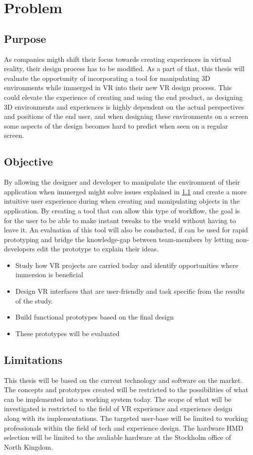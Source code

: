 \section{Problem}

\subsection{Purpose}
\label{intro:purpose}
As companies migth shift their focus towards creating experiences in virtual reality, their design process has to be modified. As a part of that, this thesis will evaluate the opportunity of incorporating a tool for manipulating 3D environments while immerged in VR into their new VR design process. This could elevate the experience of creating and using the end product, as designing 3D environments and experiences is highly dependent on the actual perspectives and positions of the end user, and when designing these environments on a screen some aspects of the design becomes hard to predict when seen on a regular screen.

\subsection{Objective}
By allowing the designer and developer to manipulate the environment of their application when immerged might solve issues explained in \ref{intro:purpose} and create a more intuitive user experience during when creating and manipulating objects in the application. By creating a tool that can allow this type of workflow, the goal is for the user to be able to make instant tweaks to the world without having to leave it. An evaluation of this tool will also be conducted, if can be used for rapid prototyping and bridge the knowledge-gap between team-members by letting non-developers edit the prototype to explain their ideas.


\begin{itemize}
	\item Study how VR projects are carried today and identify opportunities where immersion is beneficial
	\item Design VR interfaces that are user-friendly and task specific from the results of the study.
	\item Build functional prototypes based on the final design
	\item These prototypes will be evaluated
\end{itemize}

\subsection{Limitations}
This thesis will be based on the current technology and software on the market. The concepts and prototypes created will be restricted to the possibilities of what can be implemented into a working system today. The scope of what will be investigated is restricted to the field of VR experience and experience design along with its implementations. The targeted user-base will be limited to working professionals within the field of tech and experience design. The hardware HMD selection will be limited to the avaliable hardware at the Stockholm office of North Kingdom.

